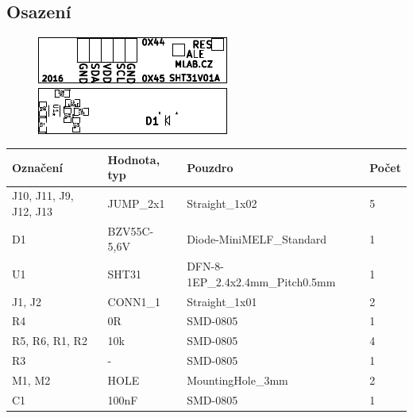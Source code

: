 \subsection{Osazení}


\begin{figure}[ht!]
	\centering
	\includegraphics[scale=2]{../../hw/CAM_PROFI/SHT31V01A-top_cropped.pdf}
	\qquad
	\includegraphics[scale=2]{../../hw/CAM_PROFI/SHT31V01A-bottom_cropped.pdf}
\end{figure}

\begin{center}
  \begin{tabular}{ | l | l | l | l |}
    \hline
    Označení & Hodnota, typ & Pouzdro & Počet \\ \hline
    \hline
			J10, J11, J9, J12, J13 & JUMP\_2x1 & Straight\_1x02 & 5\\ \hline
			D1 & BZV55C-5,6V & Diode-MiniMELF\_Standard & 1\\ \hline
			U1 & SHT31 & DFN-8-1EP\_2.4x2.4mm\_Pitch0.5mm & 1\\ \hline
			J1, J2 & CONN1\_1 & Straight\_1x01 & 2\\ \hline
			R4 & 0R & SMD-0805 & 1\\ \hline
			R5, R6, R1, R2 & 10k & SMD-0805 & 4\\ \hline
			R3 & - & SMD-0805 & 1\\ \hline
			M1, M2 & HOLE & MountingHole\_3mm & 2\\ \hline
			C1 & 100nF & SMD-0805 & 1\\ \hline
	
  \end{tabular}
\end{center}